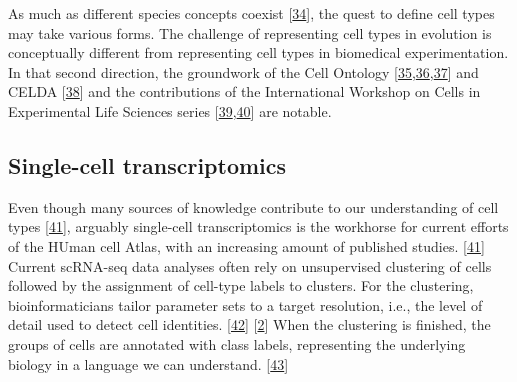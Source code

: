 As much as different species concepts coexist {[}\protect\hyperlink{ref-g74dZjOM}{34}{]}, the quest to define cell types may take various forms.
The challenge of representing cell types in evolution is conceptually different from representing cell types in biomedical experimentation.
In that second direction, the groundwork of the Cell Ontology {[}\protect\hyperlink{ref-1CI8uS6ka}{35},\protect\hyperlink{ref-gAysgnsS}{36},\protect\hyperlink{ref-17U3pGEjv}{37}{]} and CELDA {[}\protect\hyperlink{ref-RLHsA1U8}{38}{]} and the contributions of the International Workshop on Cells in Experimental Life Sciences series {[}\protect\hyperlink{ref-jX2ZmXcc}{39},\protect\hyperlink{ref-rK8KD0us}{40}{]} are notable.

\hypertarget{single-cell-transcriptomics}{%
\subsection{Single-cell transcriptomics}\label{single-cell-transcriptomics}}

Even though many sources of knowledge contribute to our understanding of cell types {[}\protect\hyperlink{ref-16phbXNJE}{41}{]}, arguably single-cell transcriptomics is the workhorse for current efforts of the HUman cell Atlas, with an increasing amount of published studies. {[}\protect\hyperlink{ref-16phbXNJE}{41}{]}
Current scRNA-seq data analyses often rely on unsupervised clustering of cells followed by the assignment of cell-type labels to clusters.
For the clustering, bioinformaticians tailor parameter sets to a target resolution, i.e., the level of detail used to detect cell identities. {[}\protect\hyperlink{ref-WKbly37M}{42}{]} {[}\protect\hyperlink{ref-1GmbExweg}{2}{]}
When the clustering is finished, the groups of cells are annotated with class labels, representing the underlying biology in a language we can understand. {[}\protect\hyperlink{ref-ii1dVqoy}{43}{]}

